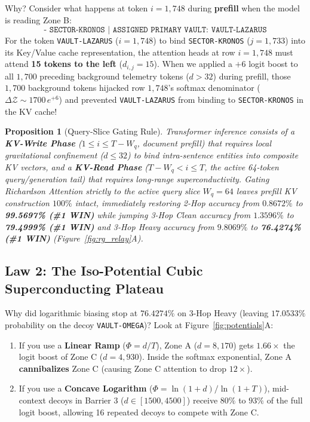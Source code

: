 \documentclass[11pt,letterpaper]{article}
\newtheorem{proposition}{Proposition}
\begin{document}
Why? Consider what happens at token $i = 1,748$ during \textbf{prefill} when the model is reading Zone B:
\[
\texttt{- SECTOR-KRONOS | ASSIGNED PRIMARY VAULT: VAULT-LAZARUS}
\]
For the token \texttt{VAULT-LAZARUS} ($i = 1,748$) to bind \texttt{SECTOR-KRONOS} ($j = 1,733$) into its Key/Value cache representation, the attention heads at row $i = 1,748$ must attend \textbf{15 tokens to the left} ($d_{i,j} = 15$). When we applied a $+6$ logit boost to all $1,700$ preceding background telemetry tokens ($d > 32$) during prefill, those $1,700$ background tokens hijacked row $1,748$'s softmax denominator ($\Delta \mathcal{Z} \sim 1700 \, e^{+6}$) and prevented \texttt{VAULT-LAZARUS} from binding to \texttt{SECTOR-KRONOS} in the KV cache!

\begin{proposition}[Query-Slice Gating Rule]
Transformer inference consists of a \textbf{KV-Write Phase} ($1 \le i \le T - W_q$, document prefill) that requires local gravitational confinement ($d \le 32$) to bind intra-sentence entities into composite KV vectors, and a \textbf{KV-Read Phase} ($T - W_q < i \le T$, the active 64-token query/generation tail) that requires long-range superconductivity. Gating Richardson Attention strictly to the active query slice $W_q = 64$ leaves prefill KV construction $100\%$ intact, immediately restoring 2-Hop accuracy from $0.8672\%$ to \textbf{99.5697\% (\#1 WIN)} while jumping 3-Hop Clean accuracy from $1.3596\%$ to \textbf{79.4999\% (\#1 WIN)} and 3-Hop Heavy accuracy from $9.8069\%$ to \textbf{76.4274\% (\#1 WIN)} (Figure~\ref{fig:rg_relay}A).
\end{proposition}

\subsection{Law 2: The Iso-Potential Cubic Superconducting Plateau}
Why did logarithmic biasing stop at $76.4274\%$ on 3-Hop Heavy (leaving $17.0533\%$ probability on the decoy \texttt{VAULT-OMEGA})? Look at Figure~\ref{fig:potentials}A:
\begin{enumerate}
    \item If you use a \textbf{Linear Ramp} ($\Phi = d/T$), Zone A ($d = 8,170$) gets $1.66\times$ the logit boost of Zone C ($d = 4,930$). Inside the softmax exponential, Zone A \textbf{cannibalizes} Zone C (causing Zone C attention to drop $12\times$).
    \item If you use a \textbf{Concave Logarithm} ($\Phi = \ln(1+d)/\ln(1+T)$), mid-context decoys in Barrier 3 ($d \in [1500, 4500]$) receive $80\%$ to $93\%$ of the full logit boost, allowing 16 repeated decoys to compete with Zone C.
\end{enumerate}
\end{document}
